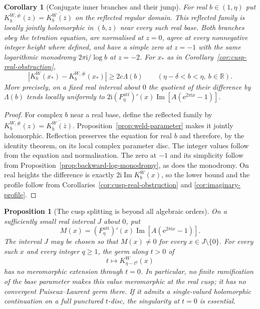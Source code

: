 \documentclass[11pt]{amsart}
\newtheorem{proposition}[theorem]{Proposition}
\newtheorem{corollary}[theorem]{Corollary}
\theoremstyle{definition}
\newcommand{\Kk}{K}
\newcommand{\eee}{\mathrm{e}}
\newcommand{\ii}{\mathrm{i}}
\begin{document}
\begin{corollary}[Conjugate inner branches and their jump]
\label{cor:conjugate-sewn-jump}
For real $b\in(1,\eta)$ put
$\Kk_b^{W,\#}(z)=\overline{\Kk_b^W(\bar z)}$ on the reflected regular
domain.  This reflected family is locally jointly holomorphic in
$(b,z)$ near every such real base.  Both branches obey the tetration
equation, are normalised at $z=0$, agree at every nonnegative integer
height where defined, and have a simple zero at $z=-1$ with the same
logarithmic monodromy $2\pi\ii/\log b$ at $z=-2$.
For $x_*$ as in Corollary~\ref{cor:cusp-real-obstruction},
\[
 |\Kk_b^W(x_*)-\Kk_b^{W,\#}(x_*)|\ge2c\Lambda(b)
 \qquad(\eta-\delta<b<\eta,\ b\in\mathbb R).
\]
More precisely, on a fixed real interval about $0$ the quotient of
their difference by $\Lambda(b)$ tends locally uniformly to
$2\ii(F_\eta^{\mathrm{att}})'(x)
\operatorname{Im}[A(\eee^{2\pi\ii x}-1)]$.
\end{corollary}

\begin{proof}
For complex $b$ near a real base, define the reflected family by
$\Kk_b^{W,\#}(z)=\overline{\Kk_{\bar b}^W(\bar z)}$.
Proposition~\ref{prop:weld-parameter} makes it jointly holomorphic.
Reflection preserves the equation for real $b$ and therefore, by the
identity theorem, on its local complex parameter disc.  The integer
values follow from the equation and normalisation.  The zero at $-1$
and its simplicity follow from Proposition~\ref{prop:backward-log-monodromy},
as does the monodromy.  On real heights the difference is exactly
$2\ii\operatorname{Im}\Kk_b^W(x)$, so the lower bound and the profile
follow from Corollaries~\ref{cor:cusp-real-obstruction} and
\ref{cor:imaginary-profile}.
\end{proof}

\begin{proposition}[The cusp splitting is beyond all algebraic orders]
\label{prop:cusp-no-puiseux}
On a sufficiently small real interval $J$ about $0$, put
\[
 M(x)=(F_\eta^{\mathrm{att}})'(x)
       \operatorname{Im}[A(\eee^{2\pi\ii x}-1)].
\]
The interval $J$ may be chosen so that $M(x)\ne0$ for every
$x\in J\setminus\{0\}$.  For every such $x$
and every integer $q\ge1$, the germ along $t>0$ of
\[
 t\longmapsto\Kk^W_{\eta-t^q}(x)
\]
has no meromorphic extension through $t=0$.  In particular, no finite
ramification of the base parameter makes this value meromorphic at
the real cusp; it has no convergent Puiseux--Laurent germ there.
If it admits a single-valued holomorphic continuation on a full
punctured $t$-disc, the singularity at $t=0$ is essential.
\end{proposition}
\end{document}
